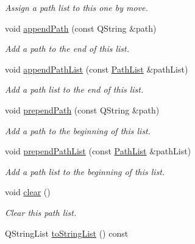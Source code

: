 \begin{DoxyCompactItemize}
\begin{DoxyCompactList}\small\item\em Assign a path list to this one by move. \end{DoxyCompactList}\item 
void \hyperlink{class_mdt_1_1_file_system_1_1_path_list_a2704cbf307bfac604570450a11806583}{append\+Path} (const Q\+String \&path)
\begin{DoxyCompactList}\small\item\em Add a path to the end of this list. \end{DoxyCompactList}\item 
void \hyperlink{class_mdt_1_1_file_system_1_1_path_list_a0ef6961000725fd653554a7dfb748d44}{append\+Path\+List} (const \hyperlink{class_mdt_1_1_file_system_1_1_path_list}{Path\+List} \&path\+List)
\begin{DoxyCompactList}\small\item\em Add a path list to the end of this list. \end{DoxyCompactList}\item 
void \hyperlink{class_mdt_1_1_file_system_1_1_path_list_a80a76af1b0023f32cbe76f4e81d94b12}{prepend\+Path} (const Q\+String \&path)
\begin{DoxyCompactList}\small\item\em Add a path to the beginning of this list. \end{DoxyCompactList}\item 
void \hyperlink{class_mdt_1_1_file_system_1_1_path_list_afdef5a8406f91dddd827e606eaee459f}{prepend\+Path\+List} (const \hyperlink{class_mdt_1_1_file_system_1_1_path_list}{Path\+List} \&path\+List)
\begin{DoxyCompactList}\small\item\em Add a path list to the beginning of this list. \end{DoxyCompactList}\item 
void \hyperlink{class_mdt_1_1_file_system_1_1_path_list_a01bc018ffa58ce1260da6f6c440cc5b1}{clear} ()\hypertarget{class_mdt_1_1_file_system_1_1_path_list_a01bc018ffa58ce1260da6f6c440cc5b1}{}\label{class_mdt_1_1_file_system_1_1_path_list_a01bc018ffa58ce1260da6f6c440cc5b1}

\begin{DoxyCompactList}\small\item\em Clear this path list. \end{DoxyCompactList}\item 
Q\+String\+List \hyperlink{class_mdt_1_1_file_system_1_1_path_list_ad91dd94e9045df759d202d0ad22254a5}{to\+String\+List} () const \hypertarget{class_mdt_1_1_file_system_1_1_path_list_ad91dd94e9045df759d202d0ad22254a5}{}\label{class_mdt_1_1_file_system_1_1_path_list_ad91dd94e9045df759d202d0ad22254a5}


\end{DoxyCompactItemize}
